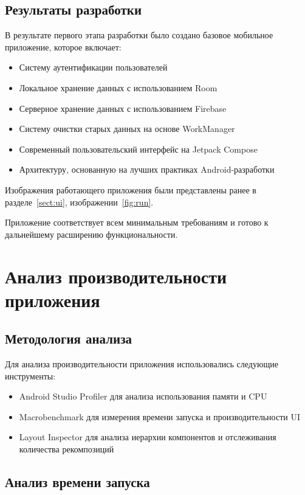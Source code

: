 \documentclass[14pt, russian]{scrartcl}
\begin{document}
\subsection{Результаты разработки}\label{sect:results}

В результате первого этапа разработки было создано базовое мобильное приложение, которое включает:

\begin{itemize}
\item Систему аутентификации пользователей
\item Локальное хранение данных с использованием Room
\item Серверное хранение данных с использованием Firebase
\item Систему очистки старых данных на основе WorkManager
\item Современный пользовательский интерфейс на Jetpack Compose
\item Архитектуру, основанную на лучших практиках Android-разработки
\end{itemize}

Изображения работающего приложения были представлены ранее в разделе~\ref{sect:ui}, изображении~\ref{fig:run}.

Приложение соответствует всем минимальным требованиям и готово к дальнейшему расширению функциональности.

\section{Анализ производительности приложения}\label{sect:performance}

\subsection{Методология анализа}\label{sect:perf-methodology}

Для анализа производительности приложения использовались следующие инструменты:

\begin{itemize}
\item Android Studio Profiler для анализа использования памяти и CPU
\item Macrobenchmark для измерения времени запуска и производительности UI
\item Layout Inspector для анализа иерархии компонентов и отслеживания количества рекомпозиций
\end{itemize}

\subsection{Анализ времени запуска}\label{sect:startup-analysis}
\end{document}
